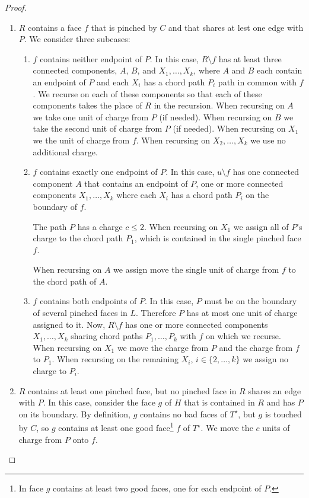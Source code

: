 \documentclass{patmorin}
\newcommand{\dual}[1]{{#1}^\star}
\begin{document}
\begin{proof}
\begin{enumerate}
     \item $R$ contains a face $f$ that is pinched by $C$ and that shares
     at lest one edge with $P$.  We consider three subcases:
     \begin{enumerate}
        \item $f$ contains neither endpoint of $P$. In this case,
        $R\setminus f$ has at least three connected components, $A$,
        $B$, and $X_1,\ldots,X_k$, where $A$ and $B$ each contain an
        endpoint of $P$ and each $X_i$ has a chord path $P_i$ path in
        common with $f$.  We recurse on each of these components so
        that each of these components takes the place of $R$ in the
        recursion. When recursing on $A$ we take one unit of charge
        from $P$ (if needed).  When recursing on $B$ we take the second
        unit of charge from $P$ (if needed).  When recursing on $X_1$ we
        the unit of charge from $f$. When recursing on $X_2,\ldots,X_k$
        we use no additional charge.

	\item $f$ contains exactly one endpoint of $P$.  In this case,
	$u\setminus f$ has one connected component $A$ that contains an
	endpoint of $P$, one or more connected components $X_1,\ldots,X_k$
	where each $X_i$ has a chord path $P_i$ on the boundary of $f$.

	The path $P$ has a charge $c\le 2$.  When recursing on $X_1$ we
	assign all of $P$'s charge to the chord path $P_1$, which is contained
        in the single pinched face $f$.
		     
	When recursing on $A$ we assign move the single unit of charge
	from $f$ to the chord path of $A$.

        \item $f$ contains both endpoints of $P$.  In this case, $P$ must
        be on the boundary of several pinched faces in $L$. Therefore $P$
        has at most one unit of charge assigned to it.  Now, $R\setminus
        f$ has one or more connected components $X_1,\ldots,X_k$ sharing
        chord paths $P_1,\ldots,P_k$ with $f$ on which we recurse.
        When recursing on $X_1$ we move the charge from $P$ and the
        charge from $f$ to $P_1$.  When recursing on the remaining $X_i$,
        $i\in\{2,\ldots,k\}$ we assign no 	charge to $P_i$.
  \end{enumerate}
  \item $R$ contains at least one pinched face, but no pinched face in $R$
  shares an edge with $P$.  In this case, consider the face $g$ of $H$
  that is contained in $R$ and has $P$ on its boundary. By definition,
  $g$ contains no bad faces of $\dual{T}$, but $g$ is touched by $C$,
  so $g$ contains at least one good face\footnote{In face $g$ contains at
  least two good faces, one for each endpoint of $P$.} $f$ of $\dual{T}$.
  We move the $c$ units of charge from $P$ onto $f$.


\end{enumerate}
\end{proof}
\end{document}
